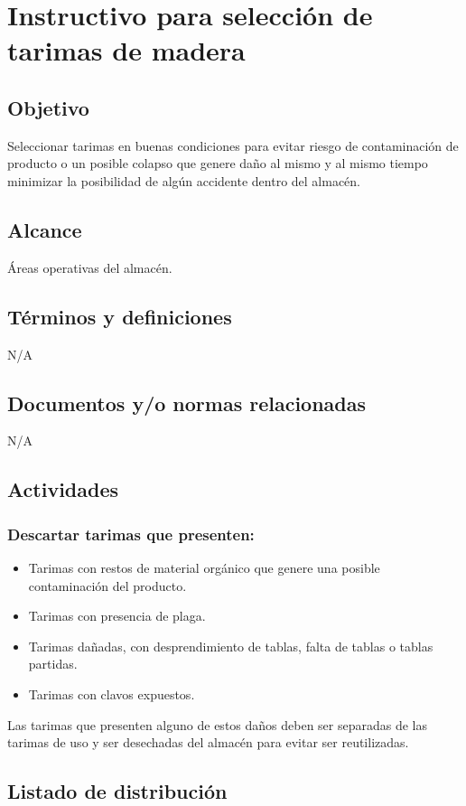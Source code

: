 \renewcommand{\MayorVer}{2}
\renewcommand{\MenorVer}{1}
\renewcommand{\Codigo}{PSA-1-PROG} %
\renewcommand{\FechaPub}{2023--01}
\renewcommand{\Titulo}{Instructivo para selección de tarimas de madera}

\section{\Titulo}

\subsection{Objetivo}

Seleccionar tarimas en buenas condiciones para evitar riesgo de contaminación de producto o un posible colapso que genere daño al mismo y al mismo tiempo minimizar la posibilidad de algún accidente dentro del almacén.

\subsection{Alcance}

Áreas operativas del almacén.

\subsection{Términos y definiciones}

N/A

\subsection{Documentos y/o normas relacionadas}

N/A

\subsection{Actividades}

\subsubsection{Descartar tarimas que presenten:}

\begin{itemize}
	\item Tarimas con restos de material orgánico que genere una posible contaminación del producto.
	\item Tarimas con presencia de plaga.
	\item Tarimas dañadas, con desprendimiento de tablas, falta de tablas o tablas partidas.
	\item Tarimas con clavos expuestos.
\end{itemize}

Las tarimas que presenten alguno de estos daños deben ser separadas de las tarimas de uso y ser desechadas del almacén para evitar ser reutilizadas.

\subsection{Listado de distribución}

